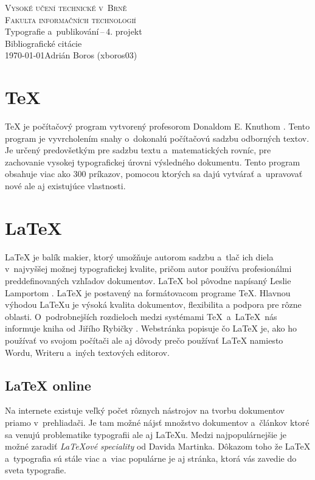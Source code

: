 \documentclass[a4paper,11pt]{article}
\begin{document}
\begin{titlepage}
\begin{center}
\Huge
\textsc{Vysoké učení technické v~Brně}\\
\huge
\textsc{Fakulta informačních technologií}\\
\LARGE Typografie a~publikování\,--\,4. projekt\\
\Huge Bibliografické citácie\\
\Large
\today\hfill Adrián Boros (xboros03)
\end{center}
\end{titlepage}

\section{\TeX}
{\TeX} je počítačový program vytvorený profesorom Donaldom E. Knuthom \cite{Knuth1986}.
Tento program je vyvrcholením snahy o~dokonalú počítačovú sadzbu odborných textov.
Je určený predovšetkým pre sadzbu textu a~matematických rovníc, pre zachovanie vysokej typografickej
úrovni výsledného dokumentu. Tento program obsahuje viac ako 300 príkazov, pomocou ktorých sa dajú vytvárať a~upravovať nové ale aj existujúce vlastnosti.

\section{\LaTeX}
{\LaTeX} je balík makier, ktorý umožňuje autorom sadzbu a~tlač ich diela
v~najvyššej možnej typografickej kvalite, pričom autor používa profesionálmi
preddefinovaných vzhľadov dokumentov. {\LaTeX} bol pôvodne napísaný Leslie
Lamportom \cite{Lamport1994}. {\LaTeX} je postavený na formátovacom programe {\TeX}. 
Hlavnou výhodou {\LaTeX}u je výsoká kvalita dokumentov, flexibilita a podpora pre rôzne oblasti. O~podrobnejších rozdieloch medzi systémami \TeX\ a~\LaTeX\ nás informuje kniha od Jiřího Rybičky \cite{Rybicka2003}. Webstránka \cite{Simecek2013} popisuje čo {\LaTeX} je, ako ho používať vo svojom počítači ale aj dôvody prečo používať {\LaTeX} namiesto Wordu, Writeru a~iných textových editorov. 

\subsection{{\LaTeX} online}
Na internete existuje veľký počet rôznych nástrojov na tvorbu dokumentov priamo v~prehliadači.
Je tam možné nájsť množstvo dokumentov a~článkov ktoré sa venujú problematike typografii ale aj {\LaTeX}u. 
Medzi najpopulárnejšie je možné zaradiť \textit{{\LaTeX}ové speciality} od Davida Martinka\cite{Martinek2010}. 
Dôkazom toho že {\LaTeX} a~typografia sú stále viac a~viac populárne je aj stránka, ktorá vás zavedie do sveta typografie\cite{Brabec2002}.
\end{document}
